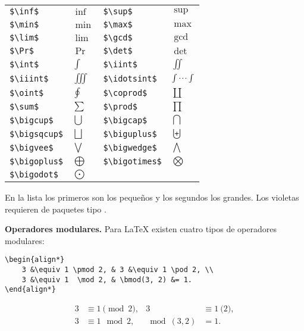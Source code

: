 \documentclass[intro-breve-latex.tex]{subfiles}
\begin{document}
\begin{longtable}{llll}
	\lstinline|$\inf$|      & $\inf$      & \lstinline|$\sup$|       & $\sup$ \\
	\lstinline|$\min$|      & $\min$      & \lstinline|$\max$|       & $\max$ \\
	\lstinline|$\lim$|      & $\lim$      & \lstinline|$\gcd$|       & $\gcd$ \\
	\lstinline|$\Pr$|       & $\Pr$       & \lstinline|$\det$|       & $\det$ \\
	\lstinline|$\int$|      & $\int$      & \lstinline|$\iint$|      & $\iint$ \\
	\lstinline|$\iiint$|    & $\iiint$    & \lstinline|$\idotsint$|  & $\idotsint$ \\
	\lstinline|$\oint$|     & $\oint$     & \lstinline|$\coprod$|    & $\coprod$ \\
	\lstinline|$\sum$|      & $\sum$      & \lstinline|$\prod$|      & $\prod$ \\
	\lstinline|$\bigcup$|   & $\bigcup$   & \lstinline|$\bigcap$|    & $\bigcap$ \\
	\lstinline|$\bigsqcup$| & $\bigsqcup$ & \lstinline|$\biguplus$|  & $\biguplus$ \\
	\lstinline|$\bigvee$|   & $\bigvee$   & \lstinline|$\bigwedge$|  & $\bigwedge$ \\
	\lstinline|$\bigoplus$| & $\bigoplus$ & \lstinline|$\bigotimes$| & $\bigotimes$ \\
	\lstinline|$\bigodot$|  & $\bigodot$  \\
\end{longtable}

En la lista los primeros son los pequeños y los segundos los grandes.
Los violetas requieren de paquetes tipo \AmS{}.

\textbf{Operadores modulares.} Para \LaTeX{} existen cuatro tipos de operadores modulares:
\begin{lstlisting}
\begin{align*}
	3 &\equiv 1 \pmod 2, & 3 &\equiv 1 \pod 2, \\
	3 &\equiv 1  \mod 2, & \bmod(3, 2) &= 1.
\end{align*}
\end{lstlisting}
\begin{align*}
	3 &\equiv 1 \pmod 2, & 3 &\equiv 1 \pod 2, \\
	3 &\equiv 1  \mod 2, & \bmod(3, 2) &= 1.
\end{align*}
\end{document}
